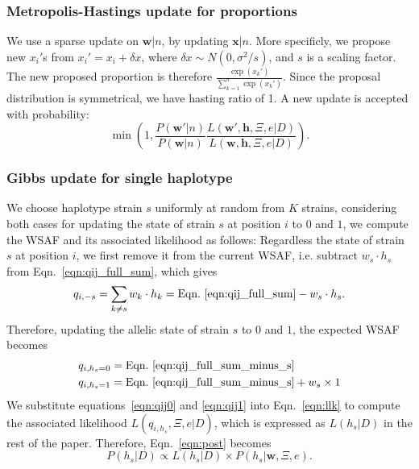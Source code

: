 \documentclass{bioinfo}
\begin{document}
\subsubsection{Metropolis-Hastings update for proportions}\label{sec:updateP}

We use a sparse update on $\mathbf{w}|n$, by updating $\mathbf{x}|n$. More specificly, we propose new $x_i'$s from $x_i' = x_i + \delta x$, where $\delta x \sim N(0, \sigma^2/s)$, and $s$ is a scaling factor. The new proposed proportion is therefore $\frac{\exp(x_k')}{\sum_{k=1}^n \exp(x_k')}$. Since the proposal distribution is symmetrical, we have hasting ratio of 1. A new update is accepted with probability:
 $$\min\left(1, \frac{P(\mathbf{w}'|n)}{P(\mathbf{w}|n)} \frac{L(\mathbf{w}', \mathbf{h},\Xi, e|D)}{L(\mathbf{w}, \mathbf{h},\Xi, e|D)}\right).$$


\subsubsection{Gibbs update for single haplotype}
We choose haplotype strain $s$ uniformly at random from $K$ strains, considering both cases for updating the state of strain $s$ at position $i$ to $0$ and $1$, we compute the WSAF and its associated likelihood as follows: Regardless the state of strain $s$ at position $i$, we first remove it from the current WSAF, i.e. subtract $ w_s \cdot h_s$ from Eqn.~\eqref{eqn:qij_full_sum}, which gives
\begin{equation}
q_{i,-s} = \sum_{k\neq s} w_k \cdot h_k = \textrm{Eqn.~\eqref{eqn:qij_full_sum}} -  w_s \cdot h_s. \label{eqn:qij_full_sum_minus_s}
\end{equation}
Therefore, updating the allelic state of strain $s$ to $0$ and $1$, the expected WSAF becomes
\begin{align}
q_{i,h_s=0} & = \textrm{Eqn.~\eqref{eqn:qij_full_sum_minus_s}} \label{eqn:qij0}\\
q_{i,h_s=1} & = \textrm{Eqn.~\eqref{eqn:qij_full_sum_minus_s}} + w_s \times 1 \label{eqn:qij1}
\end{align}
We substitute equations~\eqref{eqn:qij0} and \eqref{eqn:qij1} into Eqn.~\eqref{eqn:llk} to compute the associated likelihood $L(q_{i,h_s}, \Xi, e |D)$, which is expressed as $L(h_s |D)$ in the rest of the paper. Therefore, Eqn.~\eqref{eqn:post} becomes
\begin{equation}
P(h_s |D) \propto  L(h_s |D) \times P(h_s|\mathbf{w}, \Xi, e).\label{eqn:post_hs}
\end{equation}
\end{document}
